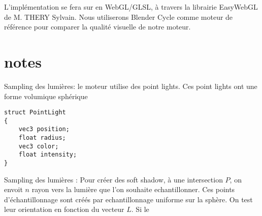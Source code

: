 \documentclass{article}
\begin{document}
L'implémentation se fera sur en WebGL/GLSL, à travers la librairie EasyWebGL de M. THERY Sylvain. Nous utiliserons Blender Cycle comme moteur de référence pour comparer la qualité visuelle de notre moteur. 

\section{notes}


Sampling des lumières: le moteur utilise des point lights. Ces point lights ont une forme volumique sphérique

\begin{lstlisting}
struct PointLight
{
    vec3 position;
    float radius;
    vec3 color;
    float intensity;
}
\end{lstlisting}
    

Sampling des lumières : Pour créer des soft shadow, à une intersection \(P\), on envoit \(n\) rayon vers la lumière que l'on souhaite echantillonner.  Ces points d'échantillonnage sont créés par echantillonnage uniforme sur la sphère. On test leur orientation en fonction du vecteur \(L\). Si le
\end{document}
